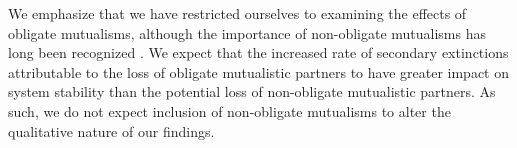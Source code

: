 \documentclass[twocolumn,preprintnumbers,amsmath,amssymb,superscriptaddress,linenumbers]{revtex4-1}
\begin{document}
We emphasize that we have restricted ourselves to examining the effects of obligate mutualisms, although the importance of non-obligate mutualisms has long been recognized \cite{RamosJiliberto2012,Vieira2015,Valdovinos2016,Ponisio2017,Valdovinos2019}.
We expect that the increased rate of secondary extinctions attributable to the loss of obligate mutualistic partners to have greater impact on system stability than the potential loss of non-obligate mutualistic partners.
As such, we do not expect inclusion of non-obligate mutualisms to alter the qualitative nature of our findings.\\
\end{document}
